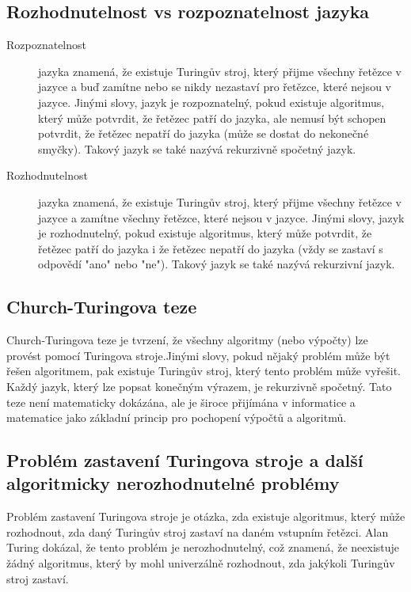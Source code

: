 \subsection{Rozhodnutelnost vs rozpoznatelnost jazyka}
\begin{description}
    \item[Rozpoznatelnost] jazyka znamená, že existuje Turingův stroj, který přijme 
    všechny řetězce v jazyce a buď zamítne nebo se nikdy nezastaví pro řetězce, které 
    nejsou v jazyce. Jinými slovy, jazyk je rozpoznatelný, pokud existuje algoritmus, 
    který může potvrdit, že řetězec patří do jazyka, ale nemusí být schopen potvrdit, 
    že řetězec nepatří do jazyka (může se dostat do nekonečné smyčky).
    Takový jazyk se také nazývá rekurzivně spočetný jazyk. 
    \item[Rozhodnutelnost] jazyka znamená, že existuje Turingův stroj, který přijme
    všechny řetězce v jazyce a zamítne všechny řetězce, které nejsou v jazyce. Jinými 
    slovy, jazyk je rozhodnutelný, pokud existuje algoritmus, který může potvrdit, že 
    řetězec patří do jazyka i že řetězec nepatří do jazyka (vždy se zastaví s odpovědí 
    "ano" nebo "ne").
    Takový jazyk se také nazývá rekurzivní jazyk.
\end{description}

\subsection{Church-Turingova teze}
Church-Turingova teze je tvrzení, že všechny algoritmy 
(nebo výpočty) lze provést pomocí Turingova stroje.Jinými slovy, pokud nějaký 
problém může být řešen algoritmem, pak existuje Turingův stroj, který tento problém 
může vyřešit. 
Každý jazyk, který lze popsat konečným výrazem, je rekurzivně spočetný.
Tato teze není matematicky dokázána, ale je široce přijímána v 
informatice a matematice jako základní princip pro pochopení výpočtů a algoritmů.

\subsection{Problém zastavení Turingova stroje a další algoritmicky nerozhodnutelné problémy}
Problém zastavení Turingova stroje je otázka, zda existuje algoritmus, který může 
rozhodnout, zda daný Turingův stroj zastaví na daném vstupním řetězci. Alan Turing 
dokázal, že tento problém je nerozhodnutelný, což znamená, že neexistuje žádný 
algoritmus, který by mohl univerzálně rozhodnout, zda jakýkoli Turingův stroj zastaví.

